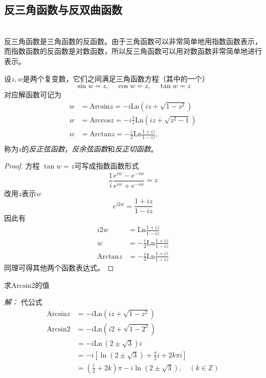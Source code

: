 \subsection{反三角函数与反双曲函数}
~\\
反三角函数是三角函数的反函数。由于三角函数可以非常简单地用指数函数表示，而指数函数的反函数是对数函数，所以反三角函数可以用对数函数非常简单地进行表示。
\begin{definition}
  设$z,w$是两个复变数，它们之间满足三角函数方程（其中的一个）
  \[ \sin w =z, \quad \cos w =z, \quad \tan w =z \]
  对应解函数可记为 
  \begin{equation}
   \begin{aligned}
    w &= \text{Arcsin}z = - i \text{Ln}(iz + \sqrt{1-z^2})\\
    w &= \text{Arccos}z = -i \frac{1}{i}  \text{Ln}(iz + \sqrt{z^2 -1})\\
    w &= \text{Arctan}z = -\frac{i}{2}\text{Ln} \frac{1+iz}{1-iz},\\
   \end{aligned}
  \end{equation}
  称为$z$的\emph{反正弦函数}，\emph{反余弦函数}和\emph{反正切函数}。 
\end{definition}
\begin{proof}
  方程 $\tan w =z $可写成指数函数形式
  \[ \frac{1}{i} \frac{e^{iw} -e^{-iw} }{e^{iw} + e^{-iw}} =z \]
  改用$z$表示$w$
  \[ e ^{i 2w} = \frac{1+iz}{1-iz}\]
  因此有 
  \[\begin{aligned}
    {i 2w} & = \text{Ln}\frac{1+iz}{1-iz} \\
    w &= - \frac{i}{2}\text{Ln}\frac{1+iz}{1-iz} \\
    \text{Arctan}z &= -\frac{i}{2}\text{Ln} \frac{1+iz}{1-iz}
  \end{aligned}\]
  同理可得其他两个函数表达式。
\end{proof}

\begin{example}
  求$\text{Arcsin}  2$的值
\end{example}
\emph{解：} 代公式 
\[ \begin{aligned}
  \text{Arcsin}z &= - i \text{Ln}(iz + \sqrt{1-z^2}) \\
  \text{Arcsin}2 &= - i \text{Ln}(i2 + \sqrt{1-2^2}) \\
  & = -i \text{Ln} \, ( 2 \pm \sqrt{3}) i\\
  & = -i \left[\ln ( 2 \pm \sqrt{3}) + \frac{\pi}{2} i + 2k \pi i \right] \\
  & =  (\frac{1}{2} + 2 k ) \pi - i \ln ( 2 \pm \sqrt{3}), \quad (k \in \mathbb{Z})
\end{aligned}\]

